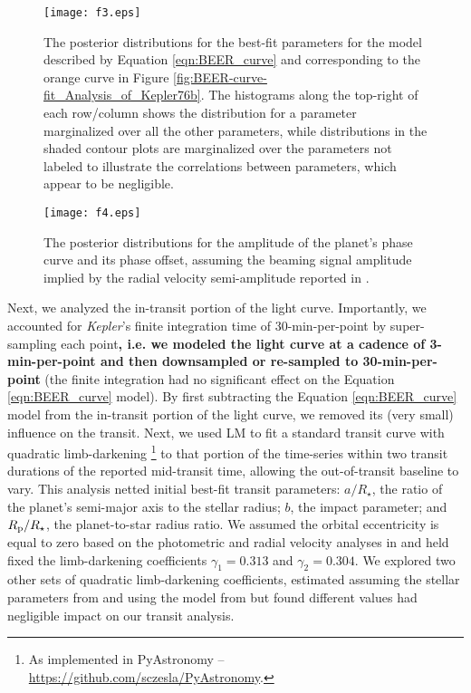 \documentclass[manuscript]{aastex62}
\newcommand{\kepler}{{\it Kepler}}
\begin{document}
\begin{figure}
\texttt{[image: f3.eps]}
\caption{The posterior distributions for the best-fit parameters for the model described by Equation \ref{eqn:BEER_curve} and corresponding to the orange curve in Figure \ref{fig:BEER-curve-fit_Analysis_of_Kepler76b}. The histograms along the top-right of each row/column shows the distribution for a parameter marginalized over all the other parameters, while distributions in the shaded contour plots are marginalized over the parameters not labeled to illustrate the correlations between parameters, which appear to be negligible. \label{fig:BEER-curve-fit-params_Analysis-of-Kepler76b}}
\end{figure}

\begin{figure}
\texttt{[image: f4.eps]}
\caption{The posterior distributions for the amplitude of the planet's phase curve and its phase offset, assuming the beaming signal amplitude implied by the radial velocity semi-amplitude reported in \citet{2013ApJ...771...26F}. \label{fig:Aplanet-delta-fit-params_Analysis-of-Kepler76b}}
\end{figure}

Next, we analyzed the in-transit portion of the light curve. Importantly, we accounted for \kepler's finite integration time of 30-min-per-point by super-sampling each point\textbf{, i.e. we modeled the light curve at a cadence of 3-min-per-point and then downsampled or re-sampled to 30-min-per-point} \citep[cf.][]{2010MNRAS.408.1758K} (the finite integration had no significant effect on the Equation \ref{eqn:BEER_curve} model). By first subtracting the Equation \ref{eqn:BEER_curve} model from the in-transit portion of the light curve, we removed its (very small) influence on the transit. Next, we used LM to fit a standard transit curve with quadratic limb-darkening \citep{2002ApJ...580L.171M}\footnote{As implemented in PyAstronomy -- \url{https://github.com/sczesla/PyAstronomy}.} to that portion of the time-series within two transit durations of the reported mid-transit time, allowing the out-of-transit baseline to vary. This analysis netted initial best-fit transit parameters: $a/R_\star$, the ratio of the planet's semi-major axis to the stellar radius; $b$, the impact parameter; and $R_{\rm p}/R_\star$, the planet-to-star radius ratio. We assumed the orbital eccentricity is equal to zero based on the photometric and radial velocity analyses in \citet{2013ApJ...771...26F} and held fixed the limb-darkening coefficients $\gamma_1 = 0.313$ and $\gamma_2 = 0.304$. We explored two other sets of quadratic limb-darkening coefficients, estimated assuming the stellar parameters from \citet{2013ApJ...771...26F} and using the model from \citet{2015MNRAS.450.1879E} but found different values had negligible impact on our transit analysis. 
\end{document}
